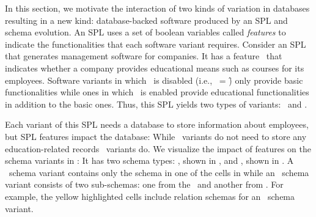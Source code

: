 
In this section, we motivate the interaction of two kinds of variation in databases 
resulting in a new kind:
database-backed software produced by an SPL and schema evolution.
An SPL uses a set of boolean variables called \emph{features} 
to indicate the functionalities that each software variant requires.
Consider an SPL that generates management software for companies. 
It has a feature \edu\ that 
indicates whether a company
provides educational means such as courses for its 
employees.
Software variants in which \edu\ is disabled (i.e., \edu\ = \f) only provide basic 
functionalities while ones in which \edu\ is enabled provide educational functionalities
in addition to the basic ones. Thus, this SPL yields two types of variants:
\basic\ and \educational.

Each variant of this SPL needs a database to store information
about employees, but SPL features impact the database: While
\basic\ variants do not need to store any education-related records 
\educational\ variants do. 
We visualize the impact of features on the schema variants in :
It has two
schema types: \basic, shown in , and \educational, shown in .
A \basic\ schema variant contains only the schema in one of the cells in 
while an \educational\ schema variant consists of two sub-schemas: one from the \basic\ 
and another from . For example,
the yellow highlighted cells include relation schemas for an \educational\ schema variant. 

